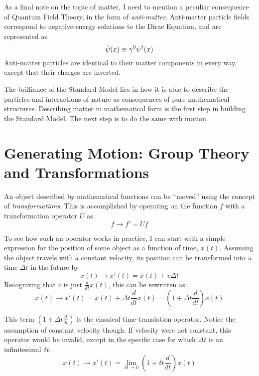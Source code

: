     As a final note on the topic of matter,
        I need to mention a peculiar consequence of Quantum Field Theory, in the form of \textit{anti-matter}.
    Anti-matter particle fields correspond to negative-energy solutions to the Dirac Equation,
        and are represented as
    \begin{equation}
        \bar{\psi}(x) \equiv \gamma^0 \psi^\dag(x)
    \end{equation}
    Anti-matter particles are identical to their matter components in every way,
        except that their charges are inverted.

    The brilliance of the Standard Model lies in how it is able to describe the 
        particles and interactions of nature as consequences of pure mathematical structures.
    Describing matter in mathematical form is the first step in building the Standard Model.
    The next step is to do the same with motion.


\section{Generating Motion: Group Theory and Transformations} \label{sec:group_theory}

    An object described by mathematical functions can be ``moved'' using the concept of \textit{transformations}.
    This is accomplished by operating on the function $f$ with a transformation operator $U$ as.
    \begin{equation}
    f \to f' = U f
    \end{equation}

    To see how such an operator works in practice,
        I can start with a simple expression for the position of some object as a function of time, $x(t)$.
    Assuming the object travels with a constant velocity,
        its position can be transformed into a time $\Delta t$ in the future by
    \begin{equation}
    x(t) \to x'(t) = x(t) + v \Delta t
    \end{equation}
    Recognizing that $v$ is just $\frac{d}{dt} x(t)$, this can be rewritten as
    \begin{equation}
    x(t) \to x'(t) = x(t) + \Delta t \frac{d}{dt} x(t) = \left(1+\Delta t \frac{d}{dt}\right) x(t)
    \end{equation}

    This term $\left(1+\Delta t \frac{d}{dt}\right)$ is the classical time-translation operator.
    Notice the assumption of constant velocity though.
    If velocity were not constant, this operator would be invalid,
        except in the specific case for which $\Delta t$ is an infinitesimal $\delta t$.
    \begin{equation}
    x(t) \to x'(t) = \lim_{\delta t \to 0} \left(1+\delta t \frac{d}{dt}\right) x(t)
    \end{equation}

